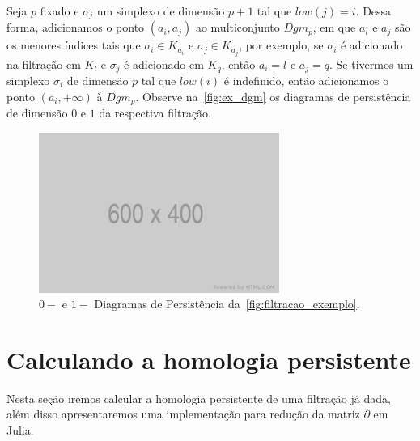 Seja $p$ fixado e $\sigma_j$ um simplexo de dimensão $p+1$ tal que $low(j)=i$.
Dessa forma, adicionamos o ponto $(a_i, a_j)$ ao multiconjunto $Dgm_p$, em que
$a_i$ e $a_j$ são os menores índices tais que $\sigma_i \in K_{a_i}$ e $\sigma_j
\in K_{a_j}$, por exemplo, se $\sigma_i$ é adicionado na filtração em $K_l$ e
$\sigma_j$ é adicionado em $K_q$, então $a_i = l$ e $a_j = q$. Se tivermos um
simplexo $\sigma_i$ de dimensão $p$ tal que $low(i)$ é indefinido, então
adicionamos o ponto $(a_i, +\infty)$ à $Dgm_p$. Observe na~\autoref{fig:ex_dgm}
os diagramas de persistência de dimensão $0$ e $1$ da respectiva filtração.
\begin{figure}[!htpb]
  \centering
  \includegraphics[width=0.7\textwidth]{images/placeholder.png}
  \caption{$0-$ e $1-$ Diagramas de Persistência da~\autoref{fig:filtracao_exemplo}.}
  \label{fig:ex_dgm}
  \fautor
\end{figure}

\section{Calculando a homologia persistente}
Nesta seção iremos calcular a homologia persistente de uma filtração já dada,
além disso apresentaremos uma implementação para redução da matriz $\partial$
em Julia.


